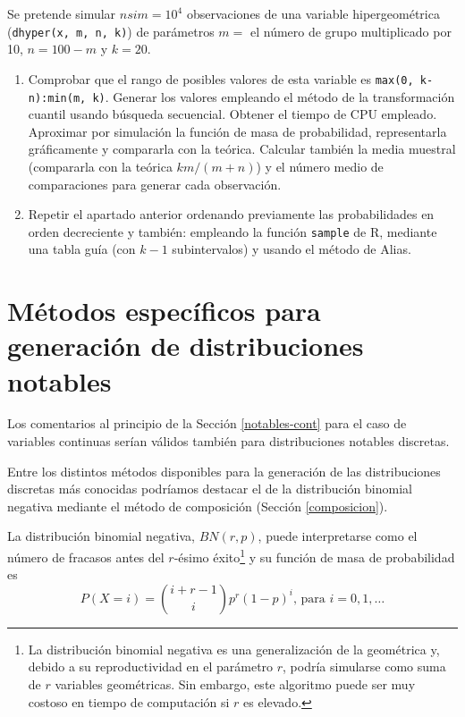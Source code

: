 \documentclass[
]{book}
\theoremstyle{break}
\theoremstyle{definition}
\theoremstyle{definition}
\theoremstyle{definition}
\theoremstyle{remark}
\begin{document}
Se pretende simular \(nsim=10^{4}\) observaciones de una variable
hipergeométrica (\texttt{dhyper(x,\ m,\ n,\ k)}) de parámetros \(m=\) el número
de grupo multiplicado por 10, \(n=100-m\) y \(k=20\).

\begin{enumerate}
\def\labelenumi{\alph{enumi})}
\item
  Comprobar que el rango de posibles valores de esta variable es
  \texttt{max(0,\ k-n):min(m,\ k)}. Generar los valores empleando el método
  de la transformación cuantil usando búsqueda secuencial. Obtener
  el tiempo de CPU empleado. Aproximar por simulación la función
  de masa de probabilidad, representarla gráficamente y compararla
  con la teórica. Calcular también la media muestral (compararla
  con la teórica \(km/(m+n)\)) y el número medio de comparaciones
  para generar cada observación.
\item
  Repetir el apartado anterior ordenando previamente las
  probabilidades en orden decreciente y también: empleando la
  función \texttt{sample} de R, mediante una tabla guía (con
  \(k-1\) subintervalos) y usando el método de Alias.
\end{enumerate}

\hypertarget{notables-disc}{%
\section{Métodos específicos para generación de distribuciones notables}\label{notables-disc}}

Los comentarios al principio de la Sección \ref{notables-cont} para el caso de variables continuas serían válidos también para distribuciones notables discretas.

Entre los distintos métodos disponibles para la generación de las distribuciones discretas más conocidas podríamos destacar el de la distribución binomial negativa mediante el método de composición (Sección \ref{composicion}).

La distribución binomial negativa, \(BN(r, p)\), puede interpretarse como el número de fracasos antes del \(r\)-ésimo éxito\footnote{La distribución binomial negativa es una generalización de la geométrica y, debido a su reproductividad en el parámetro \(r\), podría simularse como suma de \(r\) variables geométricas. Sin embargo, este algoritmo puede ser muy costoso en tiempo de computación si \(r\) es elevado.} y su función de masa de probabilidad es
\[P(X = i) = \binom{i+r-1}i p^r (1-p)^i \text{, para }i=0,1,\ldots\]
\end{document}
